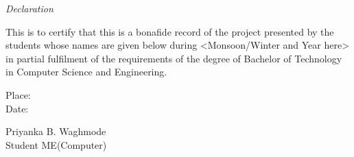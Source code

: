 \newpage
\thispagestyle{empty}

\begin{center}
\emph{\LARGE Declaration}\\[2.5cm]
\end{center}

\normalsize This is to certify that this is a bonafide record of the project presented by the students whose names are given below during <Monsoon/Winter and Year here> in partial fulfilment of the requirements of the degree of Bachelor of Technology in Computer Science and Engineering.\\[1.0cm]

\begin{flushleft}
Place:\\
Date:
\end{flushleft}




\begin{flushright}
Priyanka B. Waghmode\\
Student ME(Computer)\\[1.5cm]
\end{flushright}

